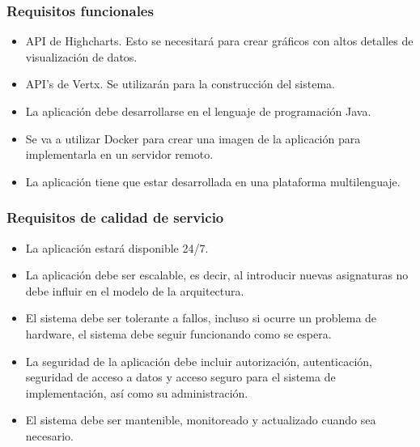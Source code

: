 \subsubsection{Requisitos funcionales}
\begin{itemize}
\item {API de Highcharts. Esto se necesitará para crear gráficos con altos detalles de visualización de datos.}
\item {API’s de Vertx. Se utilizarán para la construcción del sistema. }
\item {La aplicación debe desarrollarse en el lenguaje de programación Java.}
\item {Se va a utilizar Docker para crear una imagen de la aplicación para implementarla en un servidor remoto.}
\item {La aplicación tiene que estar desarrollada en una plataforma multilenguaje.}
\end{itemize}
\subsubsection{Requisitos de calidad de servicio}
\begin{itemize}
\item {La aplicación estará disponible 24/7.}
\item {La aplicación debe ser escalable, es decir, al introducir nuevas asignaturas no debe influir en el modelo de la arquitectura.}
\item {El sistema debe ser tolerante a fallos, incluso si ocurre un problema de hardware, el sistema debe seguir funcionando como se espera.}
\item {La seguridad de la aplicación debe incluir autorización, autenticación, seguridad de acceso a datos y acceso seguro para el sistema de implementación, así como su administración.}
\item {El sistema debe ser mantenible, monitoreado y actualizado cuando sea necesario.}
\end{itemize}
